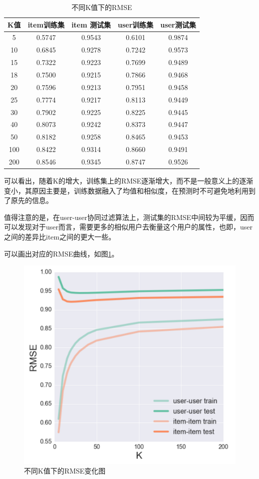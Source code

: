 \documentclass[utf8, a4paper,11pt, onecolumn]{ctexart}
\begin{document}
\begin{spacing}{1.3}
\begin{table}
	\centering
	\begin{tabular}{| c | c | c | c | c |}
		\hline
		\textbf{K值} & item训练集 & item 测试集&user训练集 & user测试集 \\ 
		\hline
		5 & 0.5747 	& 0.9543 & 0.6101 &	0.9874 \\ 
		\hline
		10 & 0.6845 &	0.9278 & 0.7242 &	0.9573 \\
		\hline
		15 & 0.7322 &	0.9223 & 0.7699 &	0.9489 \\
		\hline
		18 & 0.7500 &	0.9215 &	0.7866 &	0.9468 \\
		\hline
		20 & 0.7596 &	0.9213 & 0.7951 &	0.9458 \\
		\hline
		25 & 0.7774 &	0.9217 &	0.8113 &	0.9449 \\ 
		\hline
		30 & 0.7902 &	0.9225 &	0.8225 &	0.9445 \\
		\hline
		40 &0.8073 &	0.9242 &	0.8373 &	0.9447 \\
		\hline
		50 & 0.8182 &	0.9258 &	0.8465 &	0.9453 \\
		\hline
		100 & 0.8422 & 0.9314 &	0.8660 &	0.9491 \\
		\hline
		200 & 0.8546 &	0.9345 &	0.8747 &	0.9526 \\
		\hline 
	\end{tabular}
	\caption{不同K值下的RMSE}
	\label{k-table}
\end{table}

可以看出，随着K的增大，训练集上的RMSE逐渐增大，而不是一般意义上的逐渐变小，其原因主要是，训练数据融入了均值和相似度，在预测时不可避免地利用到了原先的信息。

值得注意的是，在user-user协同过滤算法上，测试集的RMSE中间较为平缓，因而可以发现对于user而言，需要更多的相似用户去衡量这个用户的属性，也即，user之间的差异比item之间的更大一些。

可以画出对应的RMSE曲线，如图\ref{k-figure}。

\begin{figure}
	\centering
	\includegraphics[width=0.8\linewidth]{k-figure.png}
	\caption{不同K值下的RMSE变化图}
	\label{k-figure}
\end{figure}


\end{spacing}
\end{document}
